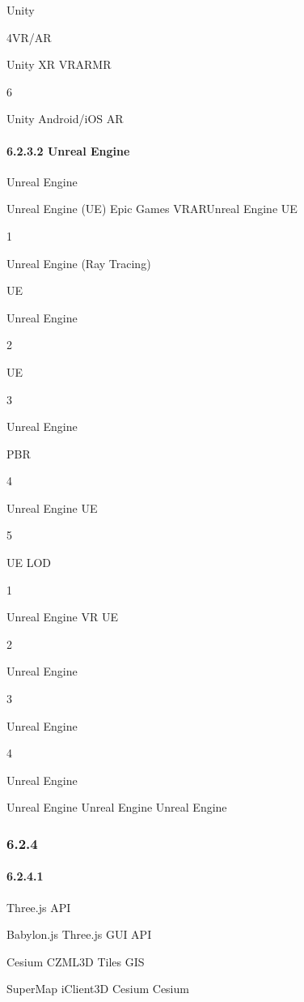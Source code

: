 Unity

4VR/AR

Unity XR VRARMR

6

Unity Android/iOS AR

\hypertarget{unreal-engine}{%
\paragraph{6.2.3.2 Unreal Engine}\label{unreal-engine}}

Unreal Engine

Unreal Engine (UE) Epic Games VRARUnreal Engine UE

1

Unreal Engine (Ray Tracing)

UE

Unreal Engine

2

UE

3

Unreal Engine

PBR

4

Unreal Engine UE

5

UE LOD

1

Unreal Engine VR UE

2

Unreal Engine

3

Unreal Engine

4

Unreal Engine

Unreal Engine Unreal Engine Unreal Engine

\hypertarget{section-51}{%
\subsubsection{6.2.4}\label{section-51}}

\hypertarget{section-52}{%
\paragraph{6.2.4.1}\label{section-52}}

Three.js API

Babylon.js Three.js GUI API

Cesium CZML3D Tiles GIS

SuperMap iClient3D Cesium Cesium

